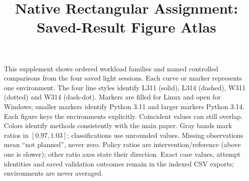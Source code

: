 \documentclass[10pt]{article}
\title{Native Rectangular Assignment: Saved-Result Figure Atlas}
\author{}
\date{}
\begin{document}
\maketitle
This supplement shows ordered workload families and named controlled comparisons from the four saved light sessions. Each curve or marker represents one environment. The four line styles identify L311 (solid), L314 (dashed), W311 (dotted) and W314 (dash-dot). Markers are filled for Linux and open for Windows; smaller markers identify Python 3.11 and larger markers Python 3.14. Each figure keys the environments explicitly. Coincident values can still overlap. Colors identify methods consistently with the main paper. Gray bands mark ratios in $[0.97,1.03]$; classifications use unrounded values. Missing observations mean ``not planned'', never zero. Policy ratios are intervention/reference (above one is slower); other ratio axes state their direction. Exact case values, attempt identities and saved validation outcomes remain in the indexed CSV exports; environments are never averaged.

\end{document}
